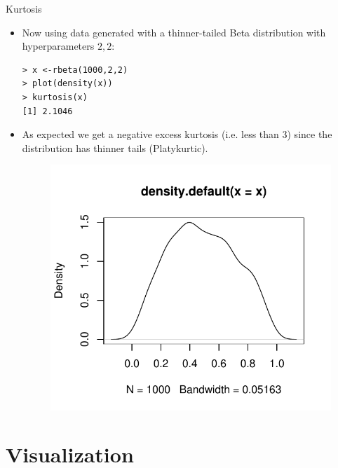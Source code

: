 \documentclass[handout]{beamer}
\begin{document}
\begin{frame}[fragile]{Kurtosis}

\scriptsize{
\begin{itemize} 
 \item Now using data generated with a thinner-tailed Beta distribution with hyperparameters $2,2$:
 
 \begin{verbatim}
> x <-rbeta(1000,2,2)
> plot(density(x))
> kurtosis(x)
[1] 2.1046
 \end{verbatim}

 \item  As expected we get a negative excess kurtosis (i.e. less than 3) since the distribution has thinner tails (Platykurtic). 
 
   \begin{figure}[h!]
	\centering
	\includegraphics[scale=0.4]{pics/kurt3.pdf}
	\end{figure} 
 
 
 
\end{itemize}

}

 
\end{frame}


\section{Visualization}
\end{document}
